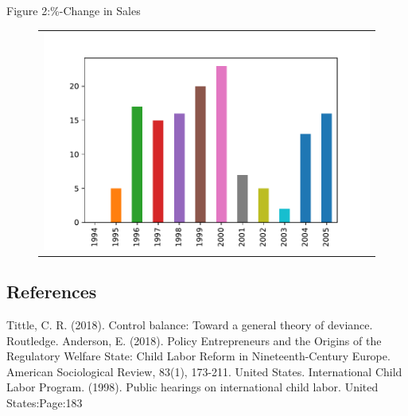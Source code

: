\documentclass[a4paper, 11pt, margin=1in]{article}
\begin{document}
Figure 2:\%-Change in Sales\\

\begin{figure}[h]
   \centering
   \begin{tabular}{c}
       \includegraphics[page=1,width=.9\textwidth]{fig2.pdf} \\
   \end{tabular}
\end{figure}

%
%

\subsection{References}
\begin{thebibliography}{9}
    Tittle, C. R. (2018). Control balance: Toward a general theory of deviance. Routledge.
    Anderson, E. (2018). Policy Entrepreneurs and the Origins of the Regulatory Welfare State: Child Labor Reform in Nineteenth-Century Europe. American Sociological Review, 83(1), 173-211.
    United States. International Child Labor Program. (1998). Public hearings on international child labor. United States:Page:183
\end{thebibliography}
\end{document}
